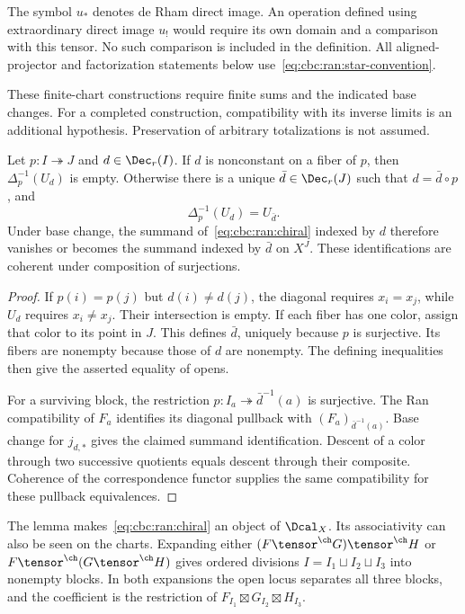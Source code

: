 The symbol $u_*$ denotes de Rham direct image.
An operation defined using extraordinary direct image $u_!$ would require its own domain and a comparison with this tensor.
No such comparison is included in the definition.
All aligned-projector and factorization statements below use~\eqref{eq:cbc:ran:star-convention}.

These finite-chart constructions require finite sums and the indicated base changes.
For a completed construction, compatibility with its inverse limits is an additional hypothesis.
Preservation of arbitrary totalizations is not assumed.

\begin{lemma}
\label{cbc:ran:collision}
Let $p:I\twoheadrightarrow J$ and $d\in\Dec_r(I)$.
If $d$ is nonconstant on a fiber of $p$, then $\Delta_p^{-1}(U_d)$ is empty.
Otherwise there is a unique $\bar d\in\Dec_r(J)$ such that
$d=\bar d\circ p$, and
\[
 \Delta_p^{-1}(U_d)=U_{\bar d}.
\]
Under base change, the summand of~\eqref{eq:cbc:ran:chiral} indexed by $d$
therefore vanishes or becomes the summand indexed by $\bar d$ on $X^J$.
These identifications are coherent under composition of surjections.
\end{lemma}
\begin{proof}
If $p(i)=p(j)$ but $d(i)\ne d(j)$, the diagonal requires $x_i=x_j$,
while $U_d$ requires $x_i\ne x_j$. Their intersection is empty.
If each fiber has one color, assign that color to its point in $J$.
This defines $\bar d$, uniquely because $p$ is surjective.
Its fibers are nonempty because those of $d$ are nonempty.
The defining inequalities then give the asserted equality of opens.

For a surviving block, the restriction
$p:I_a\twoheadrightarrow\bar d^{-1}(a)$ is surjective.
The Ran compatibility of $F_a$ identifies its diagonal pullback with
$(F_a)_{\bar d^{-1}(a)}$. Base change for $j_{d,*}$ gives the claimed
summand identification. Descent of a color through two successive
quotients equals descent through their composite.
Coherence of the correspondence functor supplies the same compatibility
for these pullback equivalences.
\end{proof}

The lemma makes~\eqref{eq:cbc:ran:chiral} an object of $\Dcal_X$.
Its associativity can also be seen on the charts.
Expanding either $(F\tensor^{\ch}G)\tensor^{\ch}H$ or
$F\tensor^{\ch}(G\tensor^{\ch}H)$ gives ordered divisions
$I=I_1\sqcup I_2\sqcup I_3$ into nonempty blocks.
In both expansions the open locus separates all three blocks, and the
coefficient is the restriction of $F_{I_1}\boxtimes G_{I_2}\boxtimes H_{I_3}$.

